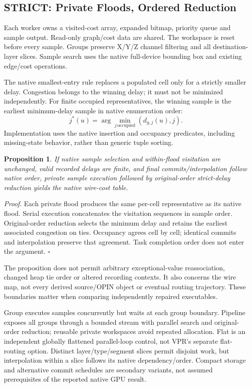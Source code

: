 \documentclass[conference,10pt,letterpaper]{IEEEtran}
\newtheorem{proposition}{Proposition}
\begin{document}
\subsection{STRICT: Private Floods, Ordered Reduction}
Each worker owns a visited-cost array, expanded bitmap, priority queue and sample output. Read-only graph/cost data are shared. The workspace is reset before every sample. Groups preserve X/Y/Z channel filtering and all destination-layer slices. Sample search uses the native full-device bounding box and existing edge/cost operations.

The native smallest-entry rule replaces a populated cell only for a strictly smaller delay. Congestion belongs to the winning delay; it must not be minimized independently. For finite occupied representatives, the winning sample is the earliest minimum-delay sample in native enumeration order:
\begin{equation}
j^*(u)=\arg\min_{j\,\mathrm{occupied}}(d_{g,j}(u),j).
\end{equation}
Implementation uses the native insertion and occupancy predicates, including missing-state behavior, rather than generic tuple sorting.

\begin{proposition}
If native sample selection and within-flood visitation are unchanged, valid recorded delays are finite, and final commits/interpolation follow native order, private sample execution followed by original-order strict-delay reduction yields the native wire-cost table.
\end{proposition}
\noindent\emph{Proof.} Each private flood produces the same per-cell representative as its native flood. Serial execution concatenates the visitation sequences in sample order. Original-order reduction selects the minimum delay and retains the earliest associated congestion on ties. Occupancy agrees cell by cell; identical commits and interpolation preserve that agreement. Task completion order does not enter the argument. $\square$

The proposition does not permit arbitrary exceptional-value reassociation, changed heap tie order or altered recording contexts. It also concerns the wire map, not every derived source/OPIN object or eventual routing trajectory. These boundaries matter when comparing independently repaired executables.

Group executes samples concurrently but waits at each group boundary. Pipeline exposes all groups through a bounded stream with parallel search and original-order reduction; reusable private workspaces avoid repeated allocation. Flat is an independent globally flattened parallel-loop control, not VPR's separate flat-routing option. Distinct layer/type/segment slices permit disjoint work, but interpolation within a slice follows its native dependency/order. Compact storage and alternative commit schedules are secondary variants, not assumed prerequisites of the reported native GPU result.
\end{document}
